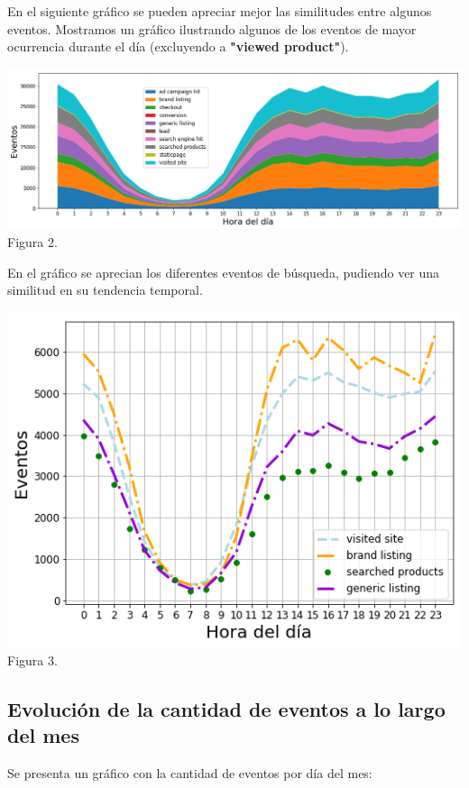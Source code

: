 \documentclass[a4paper ,12pt]{article}
\begin{document}
En el siguiente gráfico se pueden apreciar mejor las similitudes entre algunos eventos.
Mostramos un gráfico ilustrando algunos de los eventos de mayor ocurrencia durante el día (excluyendo a \textbf{"viewed product"}).\\
\begin{center}
	\includegraphics[width=1.1\linewidth]{output_16_0}
	Figura 2.
\end{center}

En el gráfico se aprecian los diferentes eventos de búsqueda, pudiendo ver una similitud en su tendencia temporal.

\begin{center}
	\includegraphics[width=1.1\linewidth]{output_18_0}
Figura 3.
	
\end{center}

\subsection{Evolución de la cantidad de eventos a lo largo del mes}
Se presenta un gráfico con la cantidad de eventos por día del mes:
\end{document}
